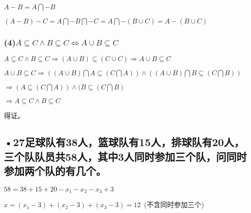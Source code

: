 \documentclass[UTF8]{ctexart}
\begin{document}
$A-B=A\bigcap -B$

$(A-B)-C=A\bigcap -B\bigcap -C=A\bigcap -(B\cup C)=A-(B\cup C)$

\subsubsection*{(4)$A\subseteq C\wedge B\subseteq C\Leftrightarrow A\cup B\subseteq C $}

$A\subseteq C\wedge B\subseteq C\Rightarrow (A\cup B)\subseteq (C\cup C)\Rightarrow A\cup B\subseteq C$

$A\cup B\subseteq C\Rightarrow ((A\cup B)\bigcap A \subseteq (C\bigcap A))\wedge ((A\cup B)\bigcap B \subseteq (C\bigcap B))$


\quad \quad \quad \quad \quad $\Rightarrow (A\subseteq ( C\bigcap A) )\wedge (B\subseteq ( C\bigcap B)$


\quad \quad \quad \quad \quad $\Rightarrow A\subseteq C\wedge B\subseteq C$

得证。
\subsection*{•27足球队有38人，篮球队有15人，排球队有20人，三个队队员共58人，其中3人同时参加三个队，问同时参加两个队的有几个。}

$58=38+15+20-x_1-x_2-x_3+3$

$x=(x_1-3)+(x_2-3)+(x_3-3)=12$\ (不含同时参加三个)
\end{document}
